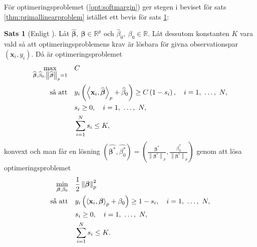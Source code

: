\documentclass[a4paper, 12pt]{report}
\theoremstyle{definition}
\newtheorem{thm}{Sats}[section]
\newtheorem{cor}[thm]{Korollarium}
\theoremstyle{remark}
\newcommand{\bfbeta}{{\boldsymbol{\beta}}}
\newcommand{\bfx}{\mathbf{x}}
\newcommand{\llangle}{\left\langle}
\newcommand{\rrangle}{\right\rangle}
\newcommand{\inner}[2]{\llangle #1, #2 \rrangle}
\begin{document}
För optimeringsproblemet (\ref{opt:softmargin}) ger stegen i beviset för sats \ref{thm:primallinearproblem} istället ett bevis för sats \ref{thm:primalsoftmargin}:
\begin{thm}[Enligt \cite{ESL}]\label{thm:primalsoftmargin}
	Låt $\widehat{\bfbeta},~\bfbeta \in \mathbb{R}^p$ och $\widehat{\beta}_0,~\beta_0 \in \mathbb{R}$. Låt dessutom konstanten $K$ vara vald så att optimeringsproblemens krav är lösbara för givna observationspar $\left(\mathbf{x}_i, y_i\right)$. Då är optimeringsproblemet
	\begin{equation*}
	\begin{aligned}
	\operatornamewithlimits{max}_{\widehat{\bfbeta}, \widehat{\beta}_0, \left\|\widehat{\bfbeta}
\right\|_p=1} & & &C\\
	\text{så att} & & &y_i\left(\inner{\bfx_i}{\widehat{\bfbeta}}_p+\widehat{\beta}_0\right)\geq C\left(1-s_i\right),\quad i=1,~\dots,~N,\\
	& & &s_i\geq0,\quad i=1,~\dots,~N,\\
	& & &\sum_{i=1}^{N}s_i \leq K,
	\end{aligned}
	\end{equation*}
	konvext och man får en lösning $\left(\widehat{\bfbeta^*},  \widehat{\beta^*_0}\right)=\left(\frac{\bfbeta^*}{\left\|\bfbeta^*\right\|_p}, \frac{\beta^*_0}{\left\|\bfbeta^*\right\|_p}\right)$ genom att lösa optimeringsproblemet
	\begin{equation*}
	\begin{aligned}
	\operatornamewithlimits{min}_{\bfbeta, \beta_0} & & &\frac{1}{2}\left\|\bfbeta
\right\|_p^2\\
	\text{så att} & & &y_i\left(\inner{\bfx_i}{\bfbeta}_p+\beta_0\right)\geq 1 - s_i,\quad i=1,~\dots,~N,\\
	& & &s_i\geq0,\quad i=1,~\dots,~N,\\
	& & &\sum_{i=1}^{N} s_i \leq K.
	\end{aligned}
	\end{equation*}
\end{thm}

\end{document}
